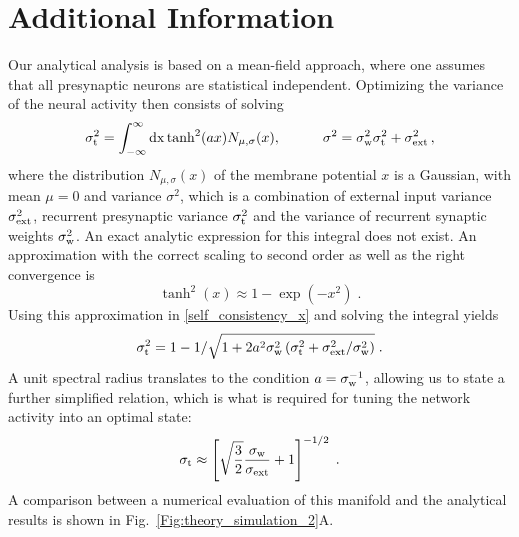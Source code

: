 \documentclass[a4paper,12pt]{article}
\begin{document}
\section{Additional Information}
Our analytical analysis is based on a mean-field approach, where one assumes that all presynaptic neurons are statistical independent.
Optimizing the variance of the neural
activity then consists of solving
%
\begin{equation}
\sigma_{\rm t}^2=\int_{-\infty}^{\infty}
{\rm dx}\tanh^2(ax) N_{\mu,\sigma}(x),
\qquad\quad
\sigma^2=\sigma_{\rm w}^2\sigma_{\rm t}^2+\sigma_{\rm ext}^2\,,
\label{self_consistency_x}
\end{equation}
%
where the distribution $N_{\mu,\sigma}(x)$ of the membrane potential $x$ is a Gaussian, with mean $\mu=0$
and variance $\sigma^2$, which is a combination of external input variance $\sigma_{\rm ext}^2$, recurrent presynaptic variance $\sigma_{\rm t}^2$ and the variance of recurrent synaptic weights $\sigma_{\rm w}^2$. An exact analytic expression for this integral does not exist. An approximation with the correct scaling to second order as well as the right convergence is
\begin{equation}
\tanh^2(x) \approx 1 - \exp\left(-x^2 \right) \; .
\end{equation}
Using this approximation in \eqref{self_consistency_x} and solving the integral yields
\begin{equation}
\sigma^2_{\rm t} = 1 - 1/\sqrt{1+2a^2\sigma^2_{\rm w}\left( \sigma^2_{\rm t} + {\sigma}^2_{\rm ext}/\sigma^2_{\rm w} \right)} \; . \label{eq:gaussian_approx}
\end{equation}
A unit spectral radius translates to the condition $a=\sigma_{\rm w}^{-1}$, allowing us to state a further simplified relation, which is what is required for tuning the network activity into an optimal state:
\begin{equation}
\sigma_{\rm t} \approx \left[\sqrt{\frac{3}{2}} \frac{\sigma_{\rm w}}{\sigma_{\rm ext}} +1\right]^{-1/2} \; . \label{eq:gauss_approx_approx}
\end{equation}
A comparison between a numerical evaluation of this manifold and the analytical results is shown in Fig.~\ref{Fig:theory_simulation_2}A.
\end{document}
